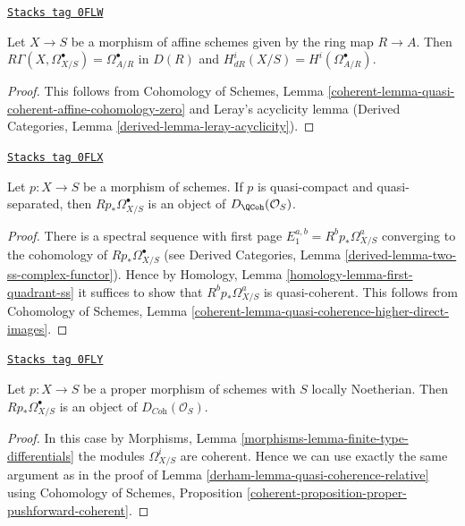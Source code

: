 \begin{lemma}
\label{derham-lemma-de-rham-affine}
\href{https://stacks.math.columbia.edu/tag/0FLW}{\texttt{Stacks tag 0FLW}}

Let $X \to S$ be a morphism of affine schemes given by the ring map
$R \to A$. Then $R\Gamma(X, \Omega^\bullet_{X/S}) = \Omega^\bullet_{A/R}$
in $D(R)$ and $H^i_{dR}(X/S) = H^i(\Omega^\bullet_{A/R})$.
\end{lemma}

\begin{proof}
This follows from Cohomology of Schemes, Lemma
\ref{coherent-lemma-quasi-coherent-affine-cohomology-zero}
and Leray's acyclicity lemma
(Derived Categories, Lemma \ref{derived-lemma-leray-acyclicity}).
\end{proof}

\begin{lemma}
\label{derham-lemma-quasi-coherence-relative}
\href{https://stacks.math.columbia.edu/tag/0FLX}{\texttt{Stacks tag 0FLX}}

Let $p : X \to S$ be a morphism of schemes. If $p$ is quasi-compact
and quasi-separated, then $Rp_*\Omega^\bullet_{X/S}$ is an object
of $D_\QCoh(\mathcal{O}_S)$.
\end{lemma}

\begin{proof}
There is a spectral sequence with first page
$E_1^{a, b} = R^bp_*\Omega^a_{X/S}$ converging to
the cohomology of $Rp_*\Omega^\bullet_{X/S}$
(see Derived Categories, Lemma \ref{derived-lemma-two-ss-complex-functor}).
Hence by Homology, Lemma \ref{homology-lemma-first-quadrant-ss}
it suffices to show that $R^bp_*\Omega^a_{X/S}$ is quasi-coherent.
This follows from Cohomology of Schemes, Lemma
\ref{coherent-lemma-quasi-coherence-higher-direct-images}.
\end{proof}

\begin{lemma}
\label{derham-lemma-coherence-relative}
\href{https://stacks.math.columbia.edu/tag/0FLY}{\texttt{Stacks tag 0FLY}}

Let $p : X \to S$ be a proper morphism of schemes with $S$ locally
Noetherian. Then $Rp_*\Omega^\bullet_{X/S}$ is an object
of $D_{\textit{Coh}}(\mathcal{O}_S)$.
\end{lemma}

\begin{proof}

In this case by Morphisms, Lemma \ref{morphisms-lemma-finite-type-differentials}
the modules $\Omega^i_{X/S}$ are coherent. Hence we can use exactly the
same argument as in the proof of Lemma \ref{derham-lemma-quasi-coherence-relative}
using Cohomology of Schemes, Proposition
\ref{coherent-proposition-proper-pushforward-coherent}.
\end{proof}


